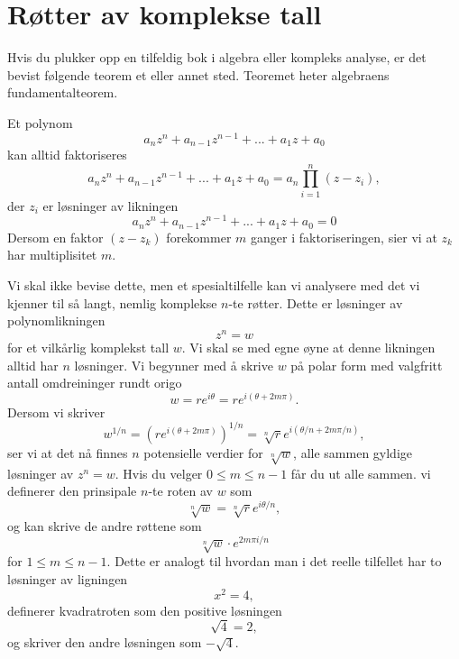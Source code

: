 \section*{Røtter av komplekse tall}
Hvis du plukker opp en tilfeldig bok i algebra eller kompleks analyse, 
er det bevist følgende teorem et eller annet sted. 
Teoremet heter algebraens fundamentalteorem.
\begin{thm}
Et polynom
\[
a_nz^n+a_{n-1}z^{n-1}+...+a_1z+a_0
\]
kan alltid faktoriseres
\[
a_nz^n+a_{n-1}z^{n-1}+...+a_1z+a_0=a_n \prod_{i=1}^n (z-z_i),
\]
der $z_i$ er løsninger av likningen
\[
a_nz^n+a_{n-1}z^{n-1}+...+a_1z+a_0=0
\]
Dersom en faktor $(z-z_k)$  forekommer $m$ ganger i faktoriseringen, 
sier vi at $z_k$ har multiplisitet $m$.
\end{thm}
Vi skal ikke bevise dette,
men et spesialtilfelle kan vi analysere med det vi kjenner til så langt, 
nemlig komplekse $n$-te røtter.  
Dette er løsninger av polynomlikningen
\[
z^n=w
\]
for et vilkårlig komplekst tall $w$. 
Vi skal se med egne øyne at denne likningen alltid har $n$ løsninger. 
Vi begynner med å skrive $w$ på polar form med valgfritt antall omdreininger rundt origo
\[
w = re^{i \theta}=re^{i (\theta+2m\pi)}.
\]
Dersom vi skriver 
\[
w^{1/n} = (re^{i (\theta+2m\pi)})^{1/n}=\sqrt[n]{r}e^{i (\theta/n+2m\pi/n)},
\]
ser vi at det nå finnes $n$ potensielle verdier for $\sqrt[n]{w}$, alle sammen gyldige løsninger av $z^n=w$. 
Hvis du velger $0\leq m \leq n-1$ får du ut alle sammen. 
vi definerer den prinsipale $n$-te roten av $w$ som
\[
\sqrt[n]{w} = \sqrt[n]{r}e^{i \theta/n},
\]
og kan skrive de andre røttene som 
\[
\sqrt[n]{w} \cdot e^{2m\pi i/n}
\]
for $1 \leq m\leq n-1$.
Dette er analogt til hvordan man i det reelle tilfellet har to løsninger av ligningen
\[
x^2=4,
\]
definerer kvadratroten som den positive løsningen
\[
\sqrt{4}=2,
\]
og skriver den andre løsningen som $-\sqrt{4}$.


